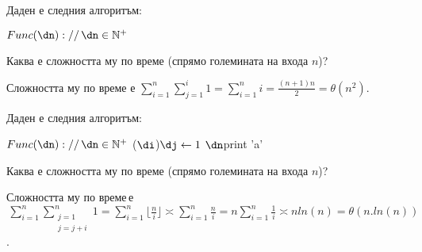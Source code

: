 \begin{problem}
	Даден е следния алгоритъм:
	\begin{pseudocode}
		
		$Func(\dn)://\,\dn\in\mathbb{N}^+$
		\Mybegin
		{
			{
			}
		}
	\end{pseudocode}
	Каква е сложността му по време (спрямо големината на входа $n$)?
\end{problem}
\begin{solution}
	Сложността му по време е $\sum\limits_{i=1}^n\sum\limits_{j=1}^i1=\sum\limits_{i=1}^n i=\frac{(n+1)n}{2}=\theta(n^2)$.
\end{solution}\leavevmode\newline

\begin{problem}
	Даден е следния алгоритъм:
	\begin{pseudocode}
		\SetKwData{di}{i}
		\SetKwData{dj}{j}
		\SetKwData{dn}{n}
		
		$Func(\dn)://\,\dn\in\mathbb{N}^+$
		\Mybegin
		{
			\Myfor{$\di\leftarrow1$ \KwTo $\dn$}
			{
				\Myfor(\Withstep $\di$){$\dj\leftarrow1$ \KwTo $\dn$}{print 'a'\;}
			}
		}
	\end{pseudocode}
	Каква е сложността му по време (спрямо големината на входа $n$)?
\end{problem}
\begin{solution}
	Сложността му по време$\,$е$\,\sum\limits_{i=1}^n\sum\limits_{\substack{j=1\\j=j+i}}^n1=\sum\limits_{i=1}^n\lfloor\frac ni\rfloor\asymp\sum\limits_{i=1}^n\frac ni=n\sum\limits_{i=1}^n\frac1i\asymp nln(n)=\theta(n.ln(n))$.
\end{solution}\newpage

